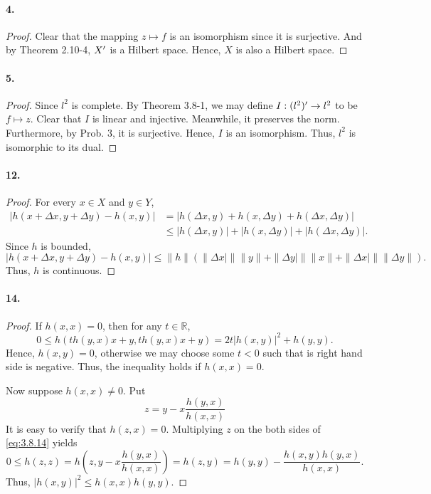   \paragraph{4.}
  \begin{proof}
    Clear that the mapping $z\mapsto f$ is an isomorphism since it is
    surjective. And by Theorem 2.10-4, $X^\prime$ is a Hilbert space. Hence, $X$ is
    also a Hilbert space.
  \end{proof}
  
  \paragraph{5.}
  \begin{proof}
    Since $l^2$ is complete. By Theorem 3.8-1, we may define $I:(l^2)^\prime\to l^2$
    to be $f\mapsto z$. Clear that $I$ is linear and injective. Meanwhile, it 
    preserves the norm. Furthermore, by Prob. 3, it is surjective. Hence, $I$
    is an isomorphism. Thus, $l^2$ is isomorphic to its dual.
  \end{proof}
  
  \paragraph{12.}
  \begin{proof}
    For every $x\in X$ and $y\in Y$,
    \begin{align*}
      |h(x+\Delta x, y+\Delta y)-h(x, y)|
      &=|h(\Delta x, y)+h(x, \Delta y)+h(\Delta x, \Delta y)| \\
      &\le|h(\Delta x, y)|+|h(x, \Delta y)|+|h(\Delta x, \Delta y)|.
    \end{align*}
    Since $h$ is bounded, 
    \[
      |h(x+\Delta x, y+\Delta y)-h(x, y)|\le
      \|h\|(\|\Delta x|\|\|y\|+\|\Delta y|\|\|x\|+\|\Delta x|\|\|\Delta y\|).
    \]
    Thus, $h$ is continuous.
  \end{proof}
  
  \paragraph{14.}
  \begin{proof}
    If $h(x,x)=0$, then for any $t\in \mathbb{R}$,
    \[
      0\le h(th(y,x)x+y,th(y,x)x+y)=2t|h(x,y)|^2+h(y,y).
    \]
    Hence, $h(x,y)=0$, otherwise we may choose some $t<0$ such that is right
    hand side is negative. Thus, the inequality holds if $h(x,x)=0$.\par
    Now suppose $h(x,x)\ne 0$. Put 
    \begin{equation}
      \label{eq:3.8.14}
      z=y-x\frac{h(y, x)}{h(x, x)}
    \end{equation}
    It is easy to verify that $h(z,x)=0$. Multiplying $z$ on the both sides of 
    \eqref{eq:3.8.14} yields
    \[
      0\le h(z,z)=h\left(z,y-x\frac{h(y, x)}{h(x, x)}\right)=h(z,y)=
      h(y,y)-\frac{h(x,y)h(y,x)}{h(x,x)}.
    \]
    Thus, $|h(x,y)|^2\le h(x,x)h(y,y)$.
  \end{proof}

